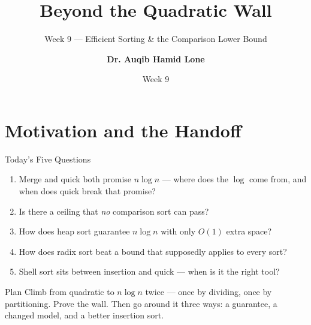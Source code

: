 \documentclass[aspectratio=169]{beamer}
\title{Beyond the Quadratic Wall}
\subtitle{Week 9 --- Efficient Sorting \& the Comparison Lower Bound}
\author[Dr. Auqib Hamid Lone]{\textbf{Dr. Auqib Hamid Lone}}
\institute[GCET Ganderbal]{PCC CS-301: Data Structures\\GCET, Ganderbal}
\date[Week 9]{\small Week 9}
\begin{document}
\frame{\titlepage}

\section{Motivation and the Handoff}

\begin{frame}{Today's Five Questions}
  \begin{enumerate}
    \item Merge and quick both promise $n \log n$ --- where does the $\log$
      come from, and when does quick break that promise?
    \item Is there a ceiling that \emph{no} comparison sort can pass?
    \item How does heap sort guarantee $n \log n$ with only $O(1)$ extra
      space?
    \item How does radix sort beat a bound that supposedly applies to every
      sort?
    \item Shell sort sits between insertion and quick --- when is it the
      right tool?
  \end{enumerate}
  \vspace{0.2cm}
  \begin{exampleblock}{Plan}
    Climb from quadratic to $n \log n$ twice --- once by dividing, once by
    partitioning. Prove the wall. Then go around it three ways: a guarantee,
    a changed model, and a better insertion sort.
  \end{exampleblock}
\end{frame}
\end{document}
